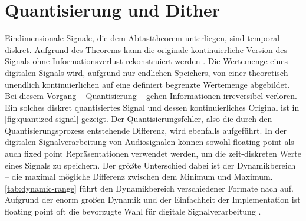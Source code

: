 
\cleartoleftpage

\thispagestyle{empty}
\vspace*{\fill}
\newpage

\onehalfspacing
{}
\setcounter{page}{1}
\pagestyle{scrheadings}
\mleftright

\section{Quantisierung und Dither}

Eindimensionale Signale, die dem \citeauthor{shannon} Abtasttheorem unterliegen, sind temporal diskret.
Aufgrund des Theorems kann die originale kontinuierliche Version des Signals ohne Informationsverlust rekonstruiert werden \autocite[S. 11 f.]{shannon}.
Die Wertemenge eines digitalen Signals wird, aufgrund nur endlichen Speichers, von einer theoretisch unendlich kontinuierlichen auf eine definiert begrenzte Wertemenge abgebildet.
Bei diesem Vorgang -- Quantisierung -- gehen Informationen irreversibel verloren.
Ein solches diskret quantisiertes Signal und dessen kontinuierliches Original ist in \autoref{fig:quantized-signal} gezeigt.
Der Quantisierungsfehler, also die durch den Quantisierungsprozess entstehende Differenz, wird ebenfalls aufgeführt.
In der digitalen Signalverarbeitung von Audiosignalen können sowohl \gls{floating point} als auch \gls{fixed point} Repräsentationen verwendet werden, um die zeit-diskreten Werte eines Signals zu speichern.
Der größte Unterschied dabei ist der Dynamikbereich -- die maximal mögliche Differenz zwischen dem Minimum und Maximum.
\autoref{tab:dynamic-range} führt den Dynamikbereich verschiedener Formate nach \citeauthor{dsp-guide} auf.
Aufgrund der enorm großen Dynamik und der Einfachheit der Implementation ist \gls{floating point} oft die bevorzugte Wahl für digitale Signalverarbeitung \autocite[S. 68 ff.]{dsp-guide}.

